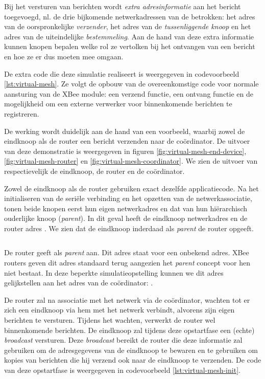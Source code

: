 Bij het versturen van berichten wordt \emph{extra adresinformatie} aan het
bericht toegevoegd, nl. de drie bijkomende netwerkadressen van de betrokken:
het adres van de oorspronkelijke \emph{verzender}, het adres van de
\emph{tussenliggende knoop} en het adres van de uiteindelijke
\emph{bestemmeling}. Aan de hand van deze extra informatie kunnen knopen
bepalen welke rol ze vertolken bij het ontvangen van een bericht en hoe ze er
dus moeten mee omgaan.

De extra code die deze simulatie realiseert is weergegeven in codevoorbeeld
\ref{lst:virtual-mesh}. Ze volgt de opbouw van de overeenkomstige code voor
normale aansturing van de XBee module: een verzend functie, een ontvang functie
en de mogelijkheid om een externe verwerker voor binnenkomende berichten te
registreren.

De werking wordt duidelijk aan de hand van een voorbeeld, waarbij zowel de
eindknoop als de router een bericht verzenden naar de co\"ordinator. De
uitvoer van deze demonstratie is weergegeven in figuren
\ref{fig:virtual-mesh-end-device}, \ref{fig:virtual-mesh-router} en
\ref{fig:virtual-mesh-coordinator}. We zien de uitvoer van respectievelijk de
eindknoop, de router en de co\"ordinator.

Zowel de eindknoop als de router gebruiken exact dezelfde applicatiecode. Na
het initialiseren van de seri\"ele verbinding en het opzetten van de
netwerkassociatie, tonen beide knopen eerst hun eigen netwerkadres en dat van
hun hi\"erarchisch ouderlijke knoop (\emph{parent}). In dit geval heeft
de eindknoop netwerkadres  en de router adres . We zien
dat de eindknoop inderdaad als \emph{parent} de router opgeeft.

\inputminted[linenos,frame=lines,framesep=2mm,fontsize=\footnotesize,firstline=97,firstnumber=97]{c}{../src/demo/lib/network.c}
\vspace{-5mm}
\vspace{3mm}

De router geeft als \emph{parent}  aan. Dit adres staat voor een
onbekend adres. XBee routers geven dit adres standaard terug aangezien het
\emph{parent} concept voor hen niet bestaat. In deze beperkte
simulatieopstelling kunnen we dit adres gelijkstellen aan het adres van de
co\"ordinator: .

De router zal na associatie met het netwerk via de co\"ordinator, wachten tot er
zich een eindknoop via hem met het netwerk verbindt, alvorens zijn eigen
berichten te versturen. Tijdens het wachten, verwerkt de router wel
binnenkomende berichten. De eindknoop zal tijdens deze opstartfase een (echte)
\emph{broadcast} versturen. Deze \emph{broadcast} bereikt de router die deze
informatie zal gebruiken om de adresgegevens van de eindknoop te bewaren en te
gebruiken om kopies van berichten die hij verzend ook naar de eindknoop te
verzenden. De code van deze opstartfase is weergegeven in codevoorbeeld
\ref{lst:virtual-mesh-init}.

